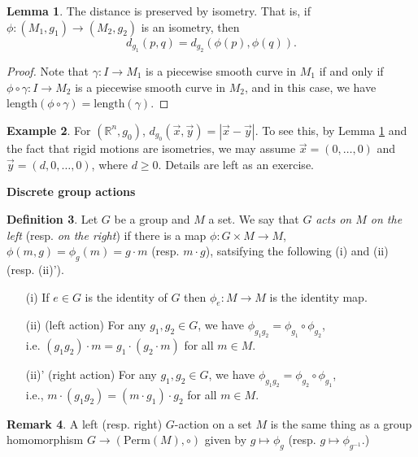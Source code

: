 \documentclass{amsart}
\numberwithin{equation}{section}
\newcommand{\bR}{\mathbb{R}}
\theoremstyle{definition}
\newtheorem{definition}{Definition} [section]
\newtheorem{example}[definition]{Example}
\newtheorem{remark}[definition]{Remark}
\theoremstyle{theorem}
\newtheorem{lemma}[definition]{Lemma}
\begin{document}
\begin{lemma}\label{eqn:dist-iso}
The distance is preserved by isometry. That is, if $\phi : (M_1, g_1) \to (M_2, g_2)$ is an isometry, then 
\[
d_{g_1}(p,q) = d_{g_2}(\phi(p), \phi(q)). 
\]
\end{lemma}
\begin{proof} Note that $\gamma:I\to M_1$ is a piecewise smooth curve in $M_1$ if and only if $\phi\circ\gamma: I\to M_2$ is a piecewise 
smooth curve in $M_2$, and in this case, we have 
$\text{length}(\phi\circ\gamma)=\text{length}(\gamma)$. 
\end{proof} 


\begin{example}
For $(\bR^n, g_0)$, $d_{g_0}(\vec{x},\vec{y}) = |\vec{x} - \vec{y}|$. 
To see this, by Lemma \ref{eqn:dist-iso} and the fact that rigid motions are isometries, we may assume
$\vec{x}=(0,\ldots,0)$ and $\vec{y}=(d,0,\ldots,0)$, where $d\geq 0$. Details are left as an exercise.  
\end{example}

\bigskip

\noindent
{\bf \large Discrete group actions}

\begin{definition}
Let $G$ be a group and $M$ a set.  We say that $G$ {\em acts on $M$ on the left} (resp. {\em on the right})  if there is a map 
$\phi : G \times M \longrightarrow M$, $\phi(m,g)= \phi_g(m) = g\cdot m$ (resp. $m\cdot g$),
satsifying the following (i) and (ii) (resp. (ii)').  
\begin{enumerate}
\item[(i)] If  $e \in G$ is the identity of $G$ then $\phi_e: M\to M$ is the identity map.
\item[(ii)] (left action) For any $g_1,g_2\in G$, we have $\phi_{g_1g_2} = \phi_{g_1} \circ \phi_{g_2}$,\\ i.e. 
$(g_1g_2)\cdot m = g_1\cdot (g_2\cdot m)$ for all $m\in M$.
\item[{(ii)'}] (right action) For any $g_1,g_2\in G$, we have
$\phi_{g_1g_2}=\phi_{g_2}\circ \phi_{g_1}$, \\ i.e.,
$m\cdot (g_1g_2)=(m\cdot g_1)\cdot g_2$ for all $m\in M$. 
\end{enumerate}
\end{definition}

\begin{remark}
A left (resp. right) $G$-action on a set $M$ is the same thing as
a group homomorphism $G \to (\text{Perm}(M),\circ)$ given by  $g\mapsto \phi_g$
(resp. $g\mapsto \phi_{g^{-1}}$.) 
\end{remark}
\end{document}
